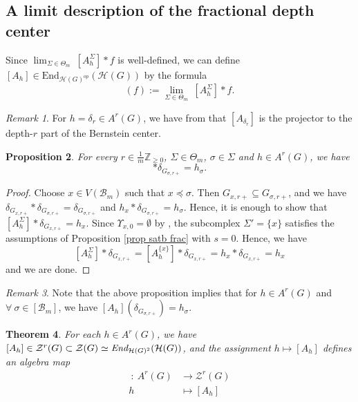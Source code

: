 \documentclass[11 pt]{article}
\numberwithin{equation}{subsection}
\newtheorem{theorem}{Theorem}[section]
\newtheorem{proposition}[theorem]{Proposition}
\theoremstyle{definition}
\theoremstyle{remark}
\newtheorem{remark}[theorem]{Remark}
\theoremstyle{conjecture}
\newcommand{\Z}{\mathbb Z}
\newcommand{\HH}{\mathcal H}
\newcommand{\B}{\mathcal{B}}
\newcommand{\mc}{\mathcal}
\begin{document}
\subsection{A limit description of the fractional depth center}
Since $\lim_{\Sigma \in \Theta_m} \:[A^\Sigma_h] * f $ is well-defined, we can define 
$[A_h] \in \text{End}_{\HH(G)^{op}}(\HH(G))$ by the formula         
\begin{equation}
    [A_h](f):=\lim_{\Sigma \in \Theta_m} \:[A^\Sigma_h] * f.
\end{equation}
\begin{remark}
    For $h=\delta_r \in A^r(G)$, we have from \cite{BKV2} that $[A_{\delta_r}]$ is the projector to the depth-$r$ part of the Bernstein center.
\end{remark}
\begin{proposition}\label{prop eval frac}
    For every $r\in \frac{1}{m}\Z_{\geq 0}$, $\Sigma \in \Theta_m$, $\sigma \in \Sigma$ and $h \in A^r(G)$, we have 
    \begin{equation}
        [A^\Sigma_h]*\delta_{G_{\sigma,r+}}=h_\sigma. 
    \end{equation}
    \end{proposition}
    \begin{proof}
        Choose $x \in V(\B_m)$ such that $x\preceq \sigma$. Then $G_{x,r+}\subseteq G_{\sigma,r+}$, and we have $\delta_{G_{x,r+}} * \delta_{G_{\sigma,r+}}= \delta_{G_{\sigma,r+}}$ and $h_x* \delta_{G_{\sigma,r+}} = h_\sigma$. Hence, it is enough to show that $[A^\Sigma_h]*\delta_{G_{x,r+}}=h_x$. Since $\Upsilon_{x,0}=\emptyset$ by \cite[Lemma 4.4]{BKV2}, the subcomplex $\Sigma'=\{x\}$ satisfies the assumptions of Proposition \ref{prop satb frac} with $s=0$. Hence, we have 
    \[
    [A^\Sigma_h]*\delta_{G_{x,r+}}= [A^{\{x\}}_h]*\delta_{G_{x,r+}}=h_x*\delta_{G_{x,r+}}=h_x
    \]
    and we are done.
    \end{proof}
\begin{remark}\label{remarkevalfrac}
    Note that the above proposition implies that for $h \in A^r(G)$ and $\forall \:\sigma \in [\B_m]$, we have $[A_h](\delta_{G_{\sigma,r+}})=h_\sigma$. 
\end{remark}
\begin{theorem}\label{thm2 frac}
      For each $h\in A^r(G)$, we have $[A_h]\in \mc Z^r(G)   \subset \mc Z(G) \simeq  \emph{End}_{\HH(G)^{2}}(\HH(G))  $, and the assignment $h\mapsto [A_h]$ defines an algebra map 
        \begin{align*}
            [A^r]\: :\: A^r(G) &\longrightarrow \mc Z^r(G) \\
            h &\longmapsto [A_h] 
        \end{align*} 
\end{theorem}
\end{document}
